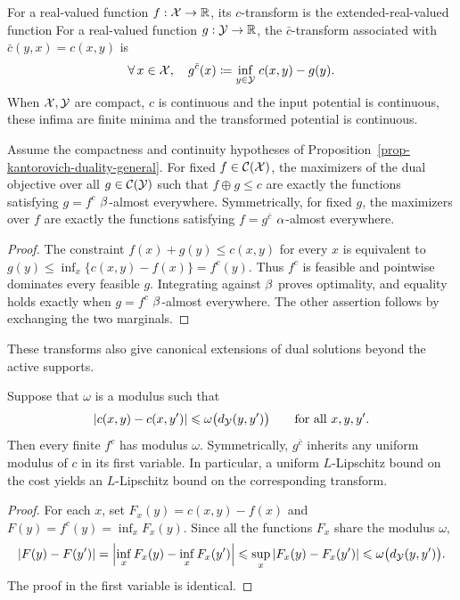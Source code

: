 \begin{defn}[$c$-transform]\label{def-c-transform}
	For a real-valued function $f:\mathcal{X}\to\mathbb{R}$, its $c$-transform is the extended-real-valued function
	For a real-valued function $g:\mathcal{Y}\to\mathbb{R}$, the $\bar c$-transform associated with $\bar c(y,x)=c(x,y)$ is
	\[
		\forall \, x \in \mathcal{X}, \quad
		g^{\bar{c}}(x) \coloneqq \underset{y \in \mathcal{Y}}{\inf}\; c(x,y) - g(y).
	\]
	When $\mathcal{X},\mathcal{Y}$ are compact, $c$ is continuous and the input potential is continuous, these infima are finite minima and the transformed potential is continuous.
\end{defn}

\begin{prop}\label{prop-c-transform-semi-relaxed}
	Assume the compactness and continuity hypotheses of Proposition~\ref{prop-kantorovich-duality-general}. For fixed $f\in\mathcal{C}(\mathcal{X})$, the maximizers of the dual objective over all $g\in\mathcal{C}(\mathcal{Y})$ such that $f\oplus g\leq c$ are exactly the functions satisfying $g=f^c$ $\beta$-almost everywhere. Symmetrically, for fixed $g$, the maximizers over $f$ are exactly the functions satisfying $f=g^{\bar c}$ $\alpha$-almost everywhere.
\end{prop}
\begin{proof}
	The constraint $f(x)+g(y)\leq c(x,y)$ for every $x$ is equivalent to
	\(g(y)\leq\inf_x\{c(x,y)-f(x)\}=f^c(y)\).
	Thus $f^c$ is feasible and pointwise dominates every feasible $g$. Integrating against $\beta$ proves optimality, and equality holds exactly when $g=f^c$ $\beta$-almost everywhere. The other assertion follows by exchanging the two marginals.
\end{proof}

These transforms also give canonical extensions of dual solutions beyond the active supports.

\begin{prop}\label{prop-c-transform-lipschitz}
	Suppose that $\omega$ is a modulus such that
	\[
		|c(x,y)-c(x,y')|
		\leqslant\omega\bigl(d_{\mathcal{Y}}(y,y')\bigr)
		\qquad\text{for all }x,y,y'.
	\]
	Then every finite $f^c$ has modulus $\omega$. Symmetrically, $g^{\bar c}$ inherits any uniform modulus of $c$ in its first variable. In particular, a uniform $L$-Lipschitz bound on the cost yields an $L$-Lipschitz bound on the corresponding transform.
\end{prop}
\begin{proof}
	For each $x$, set $F_x(y)=c(x,y)-f(x)$ and $F(y)=f^c(y)=\inf_x F_x(y)$. Since all the functions $F_x$ share the modulus $\omega$,
	\[
		|F(y)-F(y')|
		=
		\left|\inf_x F_x(y)-\inf_x F_x(y')\right|
		\leqslant
		\sup_x |F_x(y)-F_x(y')|
		\leqslant
		\omega\bigl(d_{\mathcal{Y}}(y,y')\bigr).
	\]
	The proof in the first variable is identical.
\end{proof}


